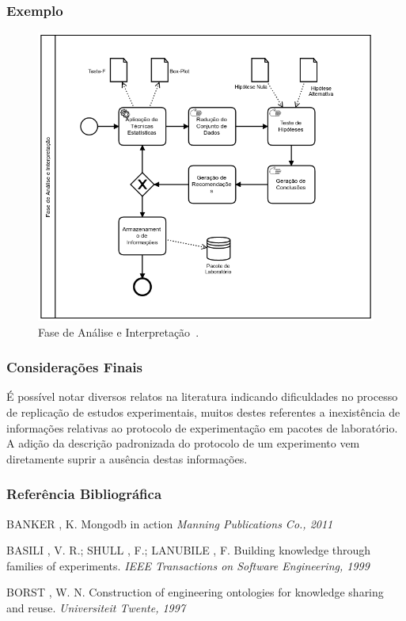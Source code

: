 \documentclass[aspectratio=169]{beamer}
\begin{document}
\begin{frame}
\frametitle{Exemplo}
\justifying

\begin{figure}
\centering
\includegraphics[scale=0.23]{images/modelo-analise.png}
\caption{Fase de Análise e Interpretação~\cite{martins}.}
\label{image:fase-analise}
\end{figure}


\end{frame}

\begin{frame}
\frametitle{Considerações Finais}
\justifying
É possível notar diversos relatos na literatura indicando dificuldades no processo de replicação de estudos experimentais, muitos destes referentes a inexistência de informações relativas ao protocolo de experimentação em pacotes de laboratório. A adição da descrição padronizada do protocolo de um experimento vem diretamente suprir a ausência destas informações.
\end{frame}


\begin{frame}
\frametitle{Referência Bibliográfica}
\footnotesize{
\begin{thebibliography}{99} %

 BANKER , K.
\newblock Mongodb in action
\newblock \emph{Manning Publications Co., 2011}

 BASILI , V. R.; SHULL , F.; LANUBILE , F.
\newblock Building knowledge through families of experiments.
\newblock \emph{IEEE Transactions on Software Engineering, 1999}

 BORST , W. N.
\newblock Construction of engineering ontologies for knowledge sharing and reuse.
\newblock \emph{Universiteit Twente, 1997}


\end{thebibliography}
}
\end{frame}
\end{document}
